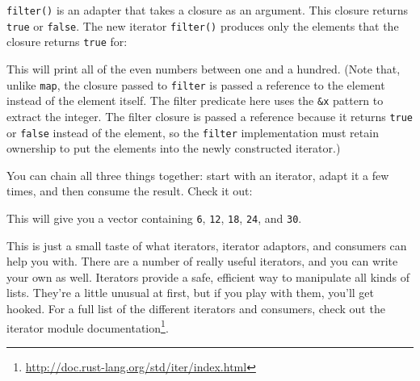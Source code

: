 \documentclass[a4paper,]{book}
\newenvironment{Shaded}{\begin{snugshade}}{\end{snugshade}}
\newcommand{\KeywordTok}[1]{\textcolor[rgb]{0.13,0.29,0.53}{\textbf{{#1}}}}
\newcommand{\DataTypeTok}[1]{\textcolor[rgb]{0.13,0.29,0.53}{{#1}}}
\newcommand{\DecValTok}[1]{\textcolor[rgb]{0.00,0.00,0.81}{{#1}}}
\newcommand{\StringTok}[1]{\textcolor[rgb]{0.31,0.60,0.02}{{#1}}}
\newcommand{\PreprocessorTok}[1]{\textcolor[rgb]{0.56,0.35,0.01}{\textit{{#1}}}}
\newcommand{\NormalTok}[1]{{#1}}
\renewcommand{\href}[2]{#2\footnote{\url{#1}}}
\begin{document}
\texttt{filter()} is an adapter that takes a closure as an argument.
This closure returns \texttt{true} or \texttt{false}. The new iterator
\texttt{filter()} produces only the elements that the closure returns
\texttt{true} for:

\begin{Shaded}
\end{Shaded}

This will print all of the even numbers between one and a hundred. (Note
that, unlike \texttt{map}, the closure passed to \texttt{filter} is
passed a reference to the element instead of the element itself. The
filter predicate here uses the \texttt{\&x} pattern to extract the
integer. The filter closure is passed a reference because it returns
\texttt{true} or \texttt{false} instead of the element, so the
\texttt{filter} implementation must retain ownership to put the elements
into the newly constructed iterator.)

You can chain all three things together: start with an iterator, adapt
it a few times, and then consume the result. Check it out:

\begin{Shaded}
\end{Shaded}

This will give you a vector containing \texttt{6}, \texttt{12},
\texttt{18}, \texttt{24}, and \texttt{30}.

This is just a small taste of what iterators, iterator adaptors, and
consumers can help you with. There are a number of really useful
iterators, and you can write your own as well. Iterators provide a safe,
efficient way to manipulate all kinds of lists. They're a little unusual
at first, but if you play with them, you'll get hooked. For a full list
of the different iterators and consumers, check out the
\href{http://doc.rust-lang.org/std/iter/index.html}{iterator module
documentation}.
\end{document}

